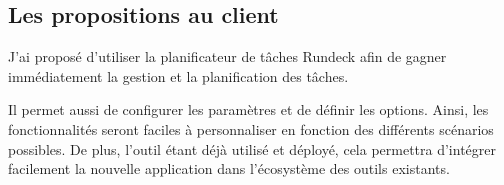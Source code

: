 \subsection{Les propositions au client}
\label{subsec:proposals-to-customer}

J'ai proposé d'utiliser la planificateur de tâches Rundeck afin de gagner immédiatement la gestion et la planification des tâches.

Il permet aussi de configurer les paramètres et de définir les options.
Ainsi, les fonctionnalités seront faciles à personnaliser en fonction des différents scénarios possibles.
De plus, l'outil étant déjà utilisé et déployé, cela permettra d'intégrer facilement la nouvelle application dans l'écosystème des outils existants.
